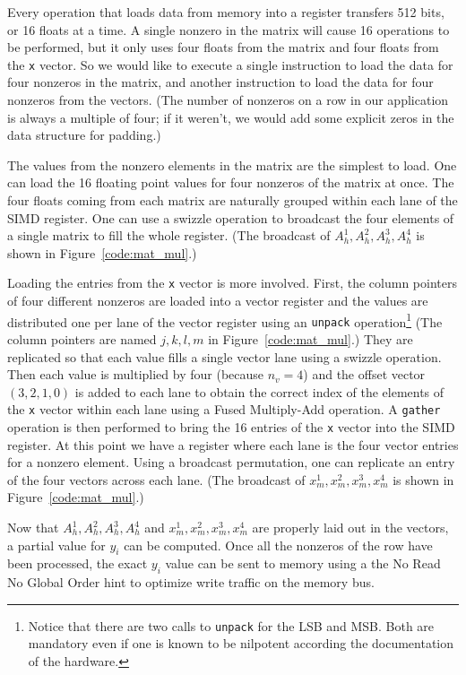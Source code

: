 \documentclass[10pt,conference,compsocconf]{IEEEtran}
\begin{document}
Every operation that loads data from memory into a register
transfers 512 bits, or 16 floats at a time. A single nonzero
in the matrix will cause 16 operations to be performed, but it only
uses four floats from the matrix and four floats from the {\tt x} vector. So
we would like to execute a single instruction to load the data for four 
nonzeros in the matrix, and another instruction to load the data for
four nonzeros from the vectors.  
(The number of nonzeros on a row in our application is
always a multiple of four; if it weren't, we would add some explicit
zeros in the data structure for padding.)

The values from the nonzero elements in the matrix are the simplest to
load. One can load the 16 floating point values for four nonzeros of
the matrix at once. The four floats coming from each matrix are
naturally grouped within each lane of the SIMD register. One can use a
swizzle operation to broadcast the four elements of a single matrix to
fill the whole register. (The broadcast of $A_h^1,A_h^2,A_h^3,A_h^4$ is
shown in Figure~\ref{code:mat_mul}.)

Loading the entries from the {\tt x} vector is  more
involved. First, the column pointers of four different nonzeros are
loaded into a vector register and the values are distributed one per
lane of the vector register using an {\tt unpack}
operation\footnote{Notice that there are two calls to {\tt unpack} for the
LSB and MSB. Both are mandatory even if one is known to be
nilpotent according the documentation of the hardware.} (The column
pointers are named $j,k,l,m$ in Figure~\ref{code:mat_mul}.) They
are replicated so that each value fills a single vector lane 
using a swizzle operation. Then each value is multiplied by four
(because $n_v=4$) 
and the offset vector $(3,2,1,0)$ is added to each lane to obtain the
correct index of the elements of the {\tt x} vector within each lane
using a Fused Multiply-Add operation. A {\tt gather} operation is then
performed to bring the 16 entries of the {\tt x} vector into the SIMD
register. At this point we have a register where each lane is the
four vector entries for a nonzero element. Using a broadcast
permutation, one can replicate an entry of the four vectors across
each lane. (The broadcast of $x_m^1,x_m^2,x_m^3,x_m^4$ is shown in
Figure~\ref{code:mat_mul}.)

Now that $A_h^1,A_h^2,A_h^3,A_h^4$ and $x_m^1,x_m^2,x_m^3,x_m^4$ are
properly laid out in the vectors, a partial value for $y_i$ can be
computed. Once all the nonzeros of the row have been processed, the
exact $y_i$ value can be sent to memory using a the No Read No Global
Order hint to optimize write traffic on the memory bus.
\end{document}
